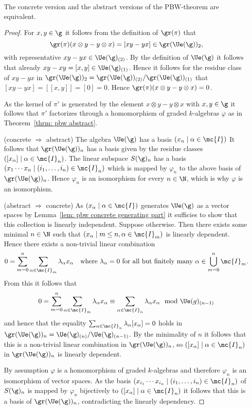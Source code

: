 \begin{proposition}
 The concrete version and the abstract versions of the PBW-theorem are equivalent.
\end{proposition}
\begin{proof}
 For $x, y \in \g$ it follows from the definition of $\gr(\pi)$ that
 \[
  \gr(\pi)(x \otimes y - y \otimes x) = [xy-yx] \in \gr(\Ue(\g))_2,
 \]
 with representative $xy-yx \in \Ue(\g)_{(2)}$. By the definition of $\Ue(\g)$ it follows that already \mbox{$xy-xy = [x,y] \in \Ue(\g)_{(1)}$}. Hence it follows for the residue class of $xy-yx$ in $\gr(\Ue(\g))_2 = \gr(\Ue(\g))_{(2)}/\gr(\Ue(\g))_{(1)}$ that $[xy-yx] = [[x,y]] = [0] = 0$. Hence $\gr(\pi)(x \otimes y - y \otimes x) = 0$.
 
 As the kernel of $\pi'$ is generated by the element $x \otimes y - y \otimes x$ with $x,y \in \g$ it follows that $\pi'$ factorizes through a homomorphism of graded $k$-algebras $\varphi$ as in Theorem~\ref{thrm: pbw abstract}.
 
 (concrete $\Rightarrow$ abstract) The algebra $\Ue(\g)$ has a basis $(x_\alpha \mid \alpha \in \mc{I})$ It follows that $\gr(\Ue(\g))_n$ has a basis given by the residue classes $([x_\alpha] \mid \alpha \in \mc{I}_n)$. The linear subspace $S(\g)_n$ has a basis $(x_1 \dotsm x_n \mid (i_1, \dotsc, i_n) \in \mc{I}_n)$ which is mapped by $\varphi_n$ to the above basis of $\gr(\Ue(\g))_n$. Hence $\varphi_n$ is an isomorphism for every $n \in \N$, which is why $\varphi$ is an isomorphism.
 
 (abstract $\Rightarrow$ concrete) As $(x_\alpha \mid \alpha \in \mc{I})$ generates $\Ue(\g)$ as a vector spaces by Lemma~\ref{lem: pbw concrete generating part} it sufficies to show that this collection is linearly independent. Suppose otherwise. Then there exists some minimal $n \in \N$ such that $(x_\alpha \mid m \leq n, \alpha \in \mc{I}_m)$ is linearly dependent. Hence there exists a non-trivial linear combination
 \[
  0 = \sum_{m=0}^n \sum_{\alpha \in \mc{I}_m} \lambda_\alpha x_\alpha
 \quad
 \text{where $\lambda_\alpha = 0$ for all but finitely many $\alpha \in \bigcup_{m=0}^n \mc{I}_m$}.
 \]
 From this it follows that
 \[
  0
  = \sum_{m=0}^n \sum_{\alpha \in \mc{I}_m} \lambda_\alpha x_\alpha
  \equiv \sum_{\alpha \in \mc{I}_n} \lambda_\alpha x_\alpha
  \mod \Ue(g)_{(n-1)}
 \]
 and hence that the equality $\sum_{\alpha \in \mc{I}_n} \lambda_\alpha [x_\alpha] = 0$ holds in $\gr(\Ue(\g))_n = \Ue(\g)_{(n)}/\Ue(\g)_{(n-1)}$. By the minimality of $n$ it follows that this is a non-trivial linear combination in $\gr(\Ue(\g))_n$, so $([x_\alpha] \mid \alpha \in \mc{I}_n)$ in $\gr(\Ue(\g))_n$ is linearly dependent.
 
 By assumption $\varphi$ is a homomorphism of graded $k$-algebras and therefore $\varphi_n$ is an isomorphism of vector spaces. As the basis $(x_{i_1} \dotsm x_{i_n} \mid (i_1, \dotsc, i_n) \in \mc{I}_n)$ of $S(\g)_n$ is mapped by $\varphi_n$ bijectively to $([x_\alpha] \mid \alpha \in \mc{I}_n)$ it follows that this is a basis of $\gr(\Ue(\g))_n$, contradicting the linearly dependency.
\end{proof}


